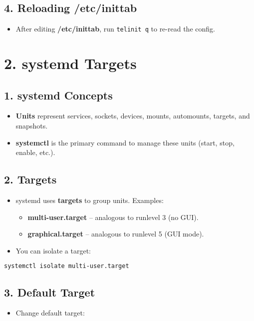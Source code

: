 \documentclass[12pt,a4paper]{report}
\begin{document}
\subsection*{4. Reloading \textbf{/etc/inittab}}
\begin{itemize}
    \item After editing \textbf{/etc/inittab}, run \texttt{telinit q} to re-read the config.
\end{itemize}

\section*{2. systemd Targets}

\subsection*{1. systemd Concepts}
\begin{itemize}
    \item \textbf{Units} represent services, sockets, devices, mounts, automounts, targets, and snapshots.
    \item \textbf{systemctl} is the primary command to manage these units (start, stop, enable, etc.).
\end{itemize}

\subsection*{2. Targets}
\begin{itemize}
    \item systemd uses \textbf{targets} to group units. Examples:
    \begin{itemize}
        \item \textbf{multi-user.target} – analogous to runlevel 3 (no GUI).
        \item \textbf{graphical.target} – analogous to runlevel 5 (GUI mode).
    \end{itemize}
    \item You can isolate a target:
\end{itemize}

\begin{lstlisting}[language=bash]
systemctl isolate multi-user.target
\end{lstlisting}

\subsection*{3. Default Target}
\begin{itemize}
    \item Change default target:
\end{itemize}
\end{document}
